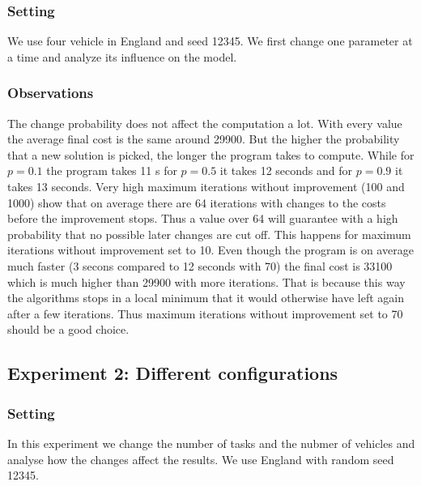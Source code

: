 \documentclass[11pt]{article}
\begin{document}
\subsubsection{Setting}
We use four vehicle in England and seed 12345. We first change one parameter at a time and analyze its influence on the model.

\subsubsection{Observations}
The change probability does not affect the computation a lot. With every value the average final cost is the same around 29900. But the higher the probability that a new solution is picked, the longer the program takes to compute. While for $p=0.1$ the program takes 11 s for $p=0.5$ it takes 12 seconds and for $p=0.9$ it takes 13 seconds. 
Very high maximum iterations without improvement (100 and 1000) show that on average there are 64 iterations with changes to the costs before the improvement stops. Thus a value over 64 will guarantee with a high probability that no possible later changes are cut off. This happens for maximum iterations without improvement set to 10. Even though the program is on average much faster (3 secons compared to 12 seconds with 70) the final cost is 33100 which is much higher than 29900 with more iterations. That is because this way the algorithms stops in a local minimum that it would otherwise have left again after a few iterations. Thus maximum iterations without improvement set to 70 should be a good choice.


\subsection{Experiment 2: Different configurations}

\subsubsection{Setting}
In this experiment we change the number of tasks and the nubmer of vehicles and analyse how the changes affect the results. We use England with random seed 12345.
\end{document}
